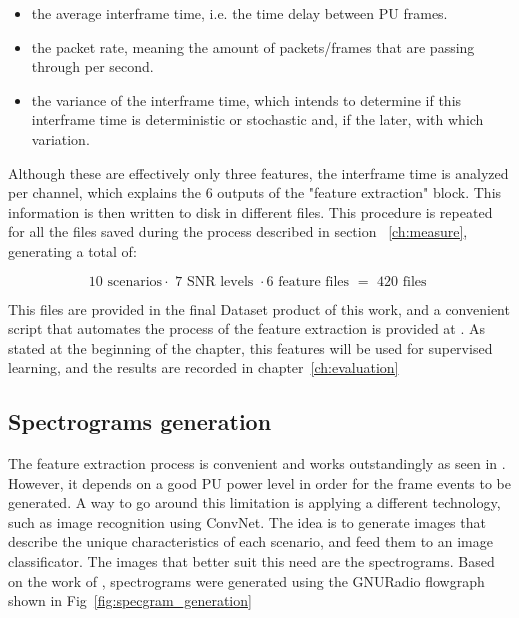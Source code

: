 \begin{itemize}
    \item the average interframe time, i.e. the time delay between \ac{PU} frames.
    \item the packet rate, meaning the amount of packets/frames that are passing through per second.
    \item the variance of the interframe time, which intends to determine if this interframe time is deterministic or stochastic and, if the later, with which variation.
\end{itemize}

Although these are effectively only three features, the interframe time is analyzed per channel, which explains the 6 outputs of the "feature extraction" block. This information is then written to disk in different files. This procedure is repeated for all the files saved during the process described in section ~\ref{ch:measure}, generating a total of:

\begin{equation}
    \text{10 scenarios} \cdot \text{ 7 SNR levels } \cdot \text{6 feature files } = \text{ 420 files }
\end{equation}

This files are provided in the final Dataset product of this work, and a convenient script that automates the process of the feature extraction is provided at \cite{repo:cognitive_radio_ml}. As stated at the beginning of the chapter, this features will be used for supervised learning, and the results are recorded in chapter~\ref{ch:evaluation}

\subsection{Spectrograms generation}

The feature extraction process is convenient and works outstandingly as seen in \cite{Wunsch2017}. However, it depends on a good \ac{PU} power level in order for the frame events to be generated. A way to go around this limitation is applying a different technology, such as image recognition using \ac{ConvNet}. The idea is to generate images that describe the unique characteristics of each scenario, and feed them to an image classificator. The images that better suit this need are the spectrograms. Based on the work of \cite{Paisana2017}, spectrograms were generated using the GNURadio flowgraph shown in Fig~\ref{fig:specgram_generation}

